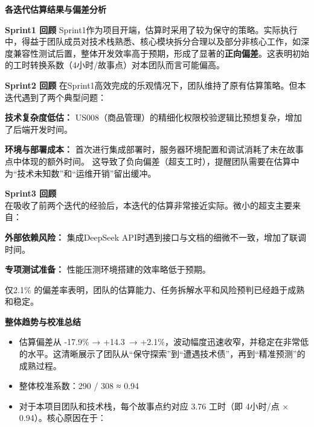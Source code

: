 \begin{levellist}
    \item \textbf{各迭代估算结果与偏差分析}
    \begin{levellist}
        \item \textbf{Sprint1 回顾}
        Sprint1作为项目开端，估算时采用了较为保守的策略。实际执行中，得益于团队成员对技术栈熟悉、核心模块拆分合理以及部分非核心工作，如深度兼容性测试后置，整体开发效率高于预期，形成了显著的\textbf{正向偏差}。这表明初始的工时转换系数（4小时/故事点）对本团队而言可能偏高。

        \item \textbf{Sprint2 回顾}
        在Sprint1高效完成的乐观情况下，团队维持了原有估算策略。但本迭代遇到了两个典型问题：
        \begin{levellist}
            \item \textbf{技术复杂度低估：} US008（商品管理）的精细化权限校验逻辑比预想复杂，增加了后端开发时间。
            \item \textbf{环境与部署成本：} 首次进行集成部署时，服务器环境配置和调试消耗了未在故事点中体现的额外时间。
            这导致了负向偏差（超支工时），提醒团队需要在估算中为“技术未知数”和“运维开销”留出缓冲。
        \end{levellist}

        \item \textbf{Sprint3 回顾} \\
        在吸收了前两个迭代的经验后，本迭代的估算非常接近实际。微小的超支主要来自：
        \begin{levellist}
            \item \textbf{外部依赖风险：} 集成DeepSeek API时遇到接口与文档的细微不一致，增加了联调时间。
            \item \textbf{专项测试准备：} 性能压测环境搭建的效率略低于预期。
        \end{levellist}
        仅2.1\% 的偏差率表明，团队的估算能力、任务拆解水平和风险预判已经趋于成熟和稳定。

        \item \textbf{整体趋势与校准总结}
        \begin{itemize}
            \item 估算偏差从 -17.9\% → +14.3\ → +2.1\%，波动幅度迅速收窄，并稳定在非常低的水平。这清晰展示了团队从“保守探索”到“遭遇技术债”，再到“精准预测”的成熟过程。
            \item 整体校准系数：290 / 308 ≈ 0.94
            \item 对于本项目团队和技术栈，每个故事点约对应 3.76 工时（即 4小时/点 × 0.94）。核心原因在于：
        \end{itemize}
    \end{levellist}



\end{levellist}
